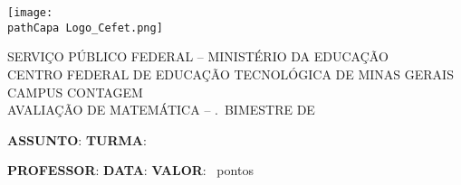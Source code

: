 %
%

\edef\pathCapa{\currfiledir}

\begin{titlepage}
    \begin{center}
        \texttt{[image: \\pathCapa Logo\_Cefet.png]}
    \end{center}

    \begin{center}
        SERVIÇO PÚBLICO FEDERAL -- MINISTÉRIO DA EDUCAÇÃO \\
        CENTRO FEDERAL DE EDUCAÇÃO TECNOLÓGICA DE MINAS GERAIS \\
        CAMPUS CONTAGEM \\
        AVALIAÇÃO DE MATEMÁTICA -- \bimestre.\textordmasculine\ BIMESTRE DE \ano
    \end{center}
    
    \vspace{0.3cm}
    
    \noindent\textbf{ASSUNTO}: \assunto \hfill \textbf{TURMA}: \turma
    
    \begin{center}
    \end{center}
    
    \begin{tcolorbox}[width=\linewidth,colback=white]
        \textbf{PROFESSOR}: \professor \hfill
        \textbf{DATA}: \dataTexto \hfill
        \textbf{VALOR}: \ValorProva\ pontos
        \vspace{5pt}
        

\end{tcolorbox}
\end{titlepage}
